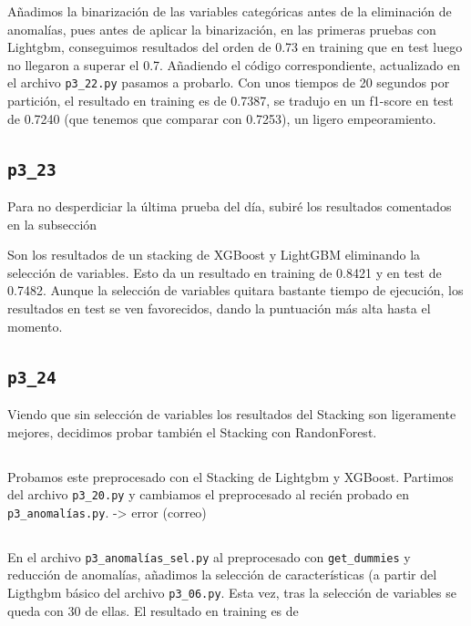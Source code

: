 \documentclass[a4paper, 20pt]{article}
\begin{document}
Añadimos la binarización de las variables categóricas antes de la eliminación de anomalías, pues antes de aplicar la binarización, en las primeras pruebas con Lightgbm, conseguimos resultados del orden de 0.73 en training que en test luego no llegaron a superar el 0.7. Añadiendo el código correspondiente, actualizado en el archivo \texttt{p3\_22.py} pasamos a probarlo. Con unos tiempos de 20 segundos por partición, el resultado en training es de 0.7387, se tradujo en un f1-score en test de 0.7240 (que tenemos que comparar con 0.7253), un ligero empeoramiento.

\subsection{\texttt{p3\_23}}

Para no desperdiciar la última prueba del día, subiré los resultados comentados en la subsección %

Son los resultados de un stacking de XGBoost y LightGBM eliminando la selección de variables. Esto da un resultado en training de 0.8421 y en test de 0.7482. Aunque la selección de variables quitara bastante tiempo de ejecución, los resultados en test se ven favorecidos, dando la puntuación más alta hasta el momento.

\subsection{\texttt{p3\_24}}

Viendo que sin selección de variables los resultados del Stacking son ligeramente mejores, decidimos probar también el Stacking con RandonForest. 

\subsection{}

Probamos este preprocesado con el Stacking de Lightgbm y XGBoost. Partimos del archivo \texttt{p3\_20.py} y cambiamos el preprocesado al recién probado en \texttt{p3\_anomalías.py}.  -> error (correo)

\subsection{}

En el archivo \texttt{p3\_anomalías\_sel.py} al preprocesado con \texttt{get\_dummies} y reducción de anomalías, añadimos la selección de características (a partir del Ligthgbm básico del archivo \texttt{p3\_06.py}. Esta vez, tras la selección de variables se queda con 30 de ellas. El resultado en training es de 
\end{document}
